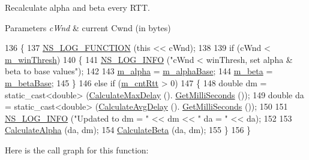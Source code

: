 Recalculate alpha and beta every R\+TT. 


\begin{DoxyParams}{Parameters}
{\em c\+Wnd} & current Cwnd (in bytes) \\
\hline
\end{DoxyParams}

\begin{DoxyCode}
136 \{
137   \hyperlink{log-macros-disabled_8h_a90b90d5bad1f39cb1b64923ea94c0761}{NS\_LOG\_FUNCTION} (\textcolor{keyword}{this} << cWnd);
138 
139   \textcolor{keywordflow}{if} (cWnd < \hyperlink{classns3_1_1TcpIllinois_a57917764f34d9810d239423d2ad3b924}{m\_winThresh})
140     \{
141       \hyperlink{group__logging_gafbd73ee2cf9f26b319f49086d8e860fb}{NS\_LOG\_INFO} (\textcolor{stringliteral}{"cWnd < winThresh, set alpha & beta to base values"});
142 
143       \hyperlink{classns3_1_1TcpIllinois_a7c7f06e3410d0647b6a262c2cef723ba}{m\_alpha} = \hyperlink{classns3_1_1TcpIllinois_a08e136c96d7a6e38606cd0885aa131d7}{m\_alphaBase};
144       \hyperlink{classns3_1_1TcpIllinois_a0d605879dbf76bb97647d9e993e78a59}{m\_beta} = \hyperlink{classns3_1_1TcpIllinois_a934a50369de8be5dc9377f0460d5a7e1}{m\_betaBase};
145     \}
146   \textcolor{keywordflow}{else} \textcolor{keywordflow}{if} (\hyperlink{classns3_1_1TcpIllinois_a60caf4d41dc12eaf51e6fa4d2bc37cf9}{m\_cntRtt} > 0)
147     \{
148       \textcolor{keywordtype}{double} dm = \textcolor{keyword}{static\_cast<}\textcolor{keywordtype}{double}\textcolor{keyword}{>} (\hyperlink{classns3_1_1TcpIllinois_afd446c963a9d47064bfe3befd1dfa016}{CalculateMaxDelay} ().
      \hyperlink{classns3_1_1Time_aba3428a8b6c4c8d9014ce44145081f34}{GetMilliSeconds} ());
149       \textcolor{keywordtype}{double} da = \textcolor{keyword}{static\_cast<}\textcolor{keywordtype}{double}\textcolor{keyword}{>} (\hyperlink{classns3_1_1TcpIllinois_a1fe8006b836cb497fe79108ab62c1c84}{CalculateAvgDelay} ().
      \hyperlink{classns3_1_1Time_aba3428a8b6c4c8d9014ce44145081f34}{GetMilliSeconds} ());
150 
151       \hyperlink{group__logging_gafbd73ee2cf9f26b319f49086d8e860fb}{NS\_LOG\_INFO} (\textcolor{stringliteral}{"Updated to dm = "} << dm << \textcolor{stringliteral}{" da = "} << da);
152 
153       \hyperlink{classns3_1_1TcpIllinois_a473c7333be614f3183c81048c93049b2}{CalculateAlpha} (da, dm);
154       \hyperlink{classns3_1_1TcpIllinois_a7306f1cde806901aed1f93d6c43ce9d4}{CalculateBeta} (da, dm);
155     \}
156 \}
\end{DoxyCode}


Here is the call graph for this function\+:




